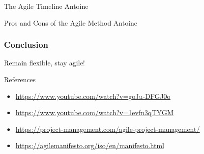 \documentclass[10pt]{beamer}
\begin{document}
\begin{frame}{The Agile Timeline}
    Antoine
\end{frame}

\begin{frame}{Pros and Cons of the Agile Method}
    Antoine
\end{frame}

\begin{frame}[plain]
  \frametitle{Conclusion}
  \begin{center}
      \Huge Remain flexible, stay agile!
  \end{center}
\end{frame}

\begin{frame}{References}
  \begin{itemize}
    \item \href{https://www.youtube.com/watch?v=goJu-DFGJ0o}{https://www.youtube.com/watch?v=goJu-DFGJ0o}
    \item \href{https://www.youtube.com/watch?v=1evfn3qTYGM}{https://www.youtube.com/watch?v=1evfn3qTYGM}
    \item \href{https://project-management.com/agile-project-management/}{https://project-management.com/agile-project-management/}
    \item \href{https://agilemanifesto.org/iso/en/manifesto.html}{https://agilemanifesto.org/iso/en/manifesto.html}
  \end{itemize}
\end{frame}
\end{document}

